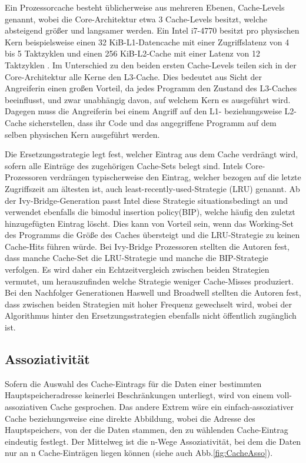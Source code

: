 Ein Prozessorcache besteht üblicherweise aus mehreren Ebenen, Cache-Levels genannt, wobei die Core-Architektur etwa 3 Cache-Levels besitzt, welche absteigend größer und langsamer werden. Ein Intel i7-4770 besitzt pro physischen Kern beispielsweise einen 32 KiB-L1-Datencache mit einer Zugriffslatenz von 4 bis 5 Taktzyklen und einen 256 KiB-L2-Cache mit einer Latenz von 12 Taktzyklen \cite{CacheStatsHaswell}.
Im Unterschied zu den beiden ersten Cache-Levels teilen sich in der Core-Architektur alle Kerne den L3-Cache. 
Dies bedeutet aus Sicht der Angreiferin einen großen Vorteil, da jedes Programm den Zustand des L3-Caches beeinflusst, und zwar unabhängig davon, auf welchem Kern es ausgeführt wird.
Dagegen muss die Angreiferin bei einem Angriff auf den L1- beziehungsweise L2-Cache sicherstellen, dass ihr Code und das angegriffene Programm auf dem selben physischen Kern ausgeführt werden.

Die Ersetzungsstrategie legt fest, welcher Eintrag aus dem Cache verdrängt wird, sofern alle Einträge des zugehörigen Cache-Sets belegt sind. 
Intels Core-Prozessoren verdrängen typischerweise den Eintrag, welcher bezogen auf die letzte Zugriffszeit am ältesten ist, auch least-recently-used-Strategie (LRU) genannt. 
Ab der Ivy-Bridge-Generation passt Intel diese Strategie situationsbedingt an \cite{CacheReplacementPolicy} und verwendet ebenfalls  die bimodul insertion policy(BIP), welche häufig den zuletzt hinzugefügten Eintrag löscht. Dies kann von Vorteil sein, wenn das Working-Set des Programms die Größe des Caches übersteigt und die LRU-Strategie zu keinen Cache-Hits führen würde.
Bei Ivy-Bridge Prozessoren stellten die Autoren fest, dass manche Cache-Set die LRU-Strategie und manche die BIP-Strategie verfolgen. Es wird daher ein Echtzeitvergleich zwischen beiden Strategien vermutet, um herauszufinden welche Strategie weniger Cache-Misses produziert. Bei den Nachfolger Generationen Haswell und Broadwell stellten die Autoren fest, dass zwischen beiden Strategien mit hoher Frequenz gewechselt wird, wobei der Algorithmus hinter den Ersetzungsstrategien ebenfalls nicht öffentlich zugänglich ist.

\subsection{Assoziativität}

Sofern die Auswahl des Cache-Eintrags für die Daten einer bestimmten Hauptspeicheradresse keinerlei Beschränkungen unterliegt, wird von einem voll-assoziativen Cache gesprochen. 
Das andere Extrem wäre ein einfach-assoziativer Cache beziehungsweise eine direkte Abbildung, wobei die Adresse des Hauptspeichers, von der die Daten stammen, den zu wählenden Cache-Eintrag eindeutig festlegt.
Der Mittelweg ist die n-Wege Assoziativität, bei dem die Daten nur an n Cache-Einträgen liegen können (siehe auch Abb.\ref{fig:CacheAsso}).

